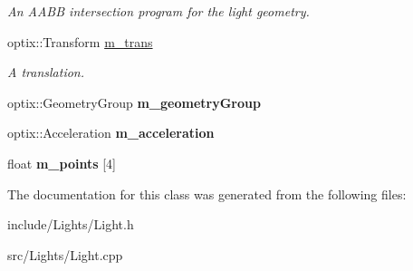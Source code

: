 \begin{DoxyCompactItemize}
\begin{DoxyCompactList}\small\item\em An A\-A\-B\-B intersection program for the light geometry. \end{DoxyCompactList}\item 
\hypertarget{class_light_a4f27233a6a4f24bd6af470325722e91f}{optix\-::\-Transform \hyperlink{class_light_a4f27233a6a4f24bd6af470325722e91f}{m\-\_\-trans}}\label{class_light_a4f27233a6a4f24bd6af470325722e91f}

\begin{DoxyCompactList}\small\item\em A translation. \end{DoxyCompactList}\item 
\hypertarget{class_light_a303ad623513cfe674f4a49096358d24e}{optix\-::\-Geometry\-Group {\bfseries m\-\_\-geometry\-Group}}\label{class_light_a303ad623513cfe674f4a49096358d24e}

\item 
\hypertarget{class_light_a4bf35bc5c66a467228b76098a8775c5c}{optix\-::\-Acceleration {\bfseries m\-\_\-acceleration}}\label{class_light_a4bf35bc5c66a467228b76098a8775c5c}

\item 
\hypertarget{class_light_a6f7c0af5a0fec1b1a8a941e14943f006}{float {\bfseries m\-\_\-points} \mbox{[}4\mbox{]}}\label{class_light_a6f7c0af5a0fec1b1a8a941e14943f006}

\end{DoxyCompactItemize}


The documentation for this class was generated from the following files\-:\begin{DoxyCompactItemize}
\item 
include/\-Lights/Light.\-h\item 
src/\-Lights/Light.\-cpp\end{DoxyCompactItemize}
